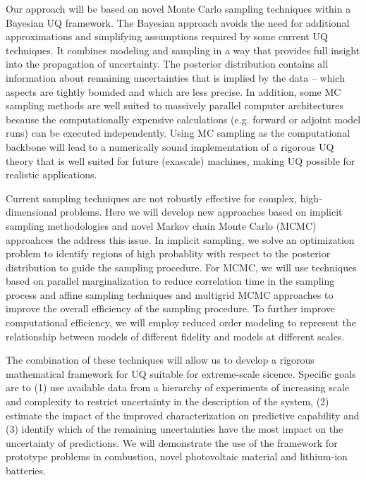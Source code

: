 \documentclass[11pt]{article}
\begin{document}
Our approach will be based on novel Monte Carlo sampling techniques within a Bayesian UQ framework.
The Bayesian approach avoids the need for additional approximations and simplifying assumptions 
required by some current UQ techniques.
It combines modeling and sampling in a way that provides full insight into the propagation of 
uncertainty.
The posterior distribution contains all information about remaining uncertainties that is implied
by the data -- which aspects are tightly bounded and which are less precise.
In addition, some MC sampling methods are well suited to massively parallel computer architectures because
the computationally expensive calculations
(e.g. forward or adjoint model runs) can be executed independently.
Using MC sampling as the computational backbone will lead to a numerically sound implementation of a rigorous UQ theory
that is well suited for future (exascale) machines, making UQ possible for realistic applications.

Current sampling techniques
are not robustly effective for complex, high-dimensional problems.
Here we will develop new approaches based on implicit sampling methodologies and novel
Markov chain Monte Carlo (MCMC) approahces the address this issue.  In implicit sampling, we solve
an optimization problem to identify regions of high probablity with respect to the posterior
distribution to guide the sampling procedure.
For MCMC, we will use techniques based on parallel marginalization to reduce correlation time in the
sampling process and affine sampling techniques and multigrid MCMC approaches to improve the
overall efficiency of the sampling procedure.
To further improve computational efficiency, we will employ reduced order modeling to represent
the relationship between models of different fidelity and models at different scales.

The combination of these techniques will allow us to develop a rigorous mathematical framework  
for UQ suitable for extreme-scale sicence.
Specific goals are to
(1) use available data from a hierarchy
of experiments of increasing scale and complexity to restrict
uncertainty in the description of the system, (2) estimate the impact of the improved characterization
on predictive capability and (3) identify which of the remaining uncertainties have the most impact
on the uncertainty of predictions.
We will demonstrate the use of the framework for prototype problems in combustion,
novel photovoltaic material and lithium-ion batteries.
\end{document}
